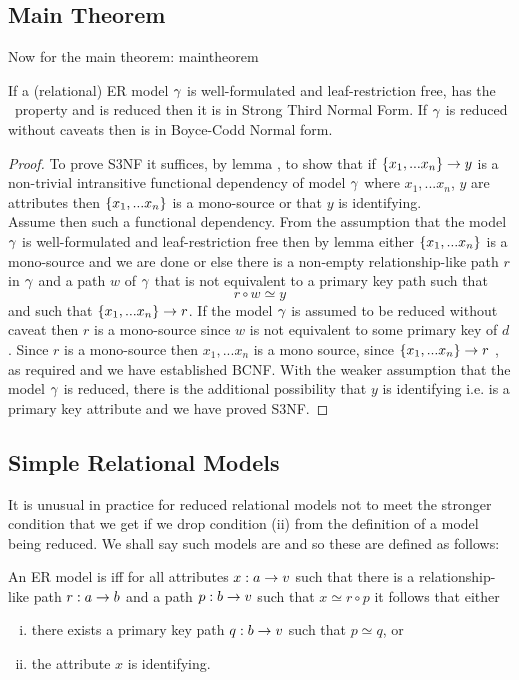 \subsection{Main Theorem}
\noindent Now for the main theorem:
maintheorem
\begin{theorem}
\noindent If a (relational) ER model $\gamma$ is well-formulated and leaf-restriction free, has the \fdfactoring\ property and is reduced then it is in Strong Third Normal Form. 
If  $\gamma$ is reduced without caveats then is in Boyce-Codd Normal form.
\end{theorem}
\begin{proof}
To prove S3NF it suffices, by lemma ,  to show that if 
$\left\{x_1,...x_n\right\} \rightarrow y$ is a non-trivial intransitive functional dependency of model $\gamma$
where $x_1,...x_n$, $y$ are attributes 
then  $\left\{x_1,...x_n\right\}$ is a mono-source or that $y$ is identifying. \\
Assume then such a functional dependency.
From the assumption that the model $\gamma$ is well-formulated and leaf-restriction free
then by lemma  
either $\left\{x_1,...x_n\right\}$ is a mono-source and we are done
or else there is a non-empty relationship-like path $r$ in $\gamma$
and a path $w$ of $\gamma$ that is not  equivalent to a primary key path such that
\begin{equation}
\label{simpleRepresentation}
 r \circ w \simeq y
\end{equation}
and such that $\left\{x_1,...x_n\right\} \rightarrow r$.
If the model $\gamma$ is assumed to be reduced without caveat then $r$ is a mono-source since $w$ is not equivalent to some primary key of $d$.
Since $r$ is a mono-source then $x_1,...x_n$ is a mono source, 
since $\left\{x_1,...x_n\right\} \rightarrow r$ , as required and we have established BCNF.
With the weaker assumption that the model $\gamma$ is reduced, there is the additional possibility that $y$ is identifying i.e. is a primary key attribute and we have proved S3NF.
\end{proof}

\subsection{Simple Relational Models}
It is unusual in practice for reduced relational models not to meet the stronger condition that we get if we drop condition (ii) from the definition of a model being reduced. We shall say such models are  and so these are defined as follows:
\begin{definition} 
An  ER model is  iff for all attributes $x:a \rightarrow v$
such that there is a relationship-like path $r:a \rightarrow b$ and a path $p:b \rightarrow v$ such that
$x \simeq r \circ p$ it follows that 
either 
\begin{enumerate} [(i)]
\item there exists a primary key path  $q:b \rightarrow v$ such that $p \simeq q$, or
\item the attribute $x$ is identifying.
\end{enumerate}
\end{definition}

